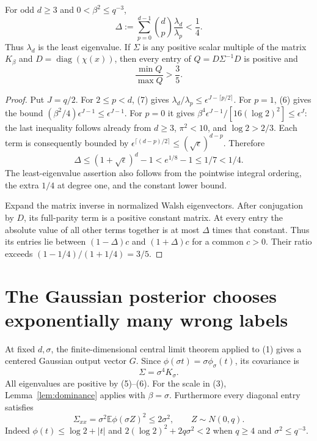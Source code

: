 \documentclass[11pt]{article}
\newcommand{\E}{\mathbb E}\newcommand{\Pp}{\mathbb P}
\begin{document}
\begin{lemma}\label{lem:dominance}
For odd $d\ge3$ and $0<\beta^2\le q^{-3}$,
\[
 \Delta:=\sum_{p=0}^{d-1}\binom dp\frac{\lambda_d}{\lambda_p}
                                   <\frac14.                 \tag{9}
\]
Thus $\lambda_d$ is the least eigenvalue. If $\Sigma$ is any positive
scalar multiple of the matrix $K_\beta$ and
$D=\operatorname{diag}(\chi(x))$, then every entry of
$Q=D\Sigma^{-1}D$ is positive and
\[
                   \frac{\min Q}{\max Q}>\frac35.             \tag{10}
\]
\end{lemma}
\begin{proof}
Put $J=q/2$. For $2\le p<d$, (7) gives
$\lambda_d/\lambda_p\le\epsilon^{J-\lceil p/2\rceil}$.
For $p=1$, (6) gives the bound
$(\beta^2/4)\epsilon^{J-1}\le\epsilon^{J-1}$.
For $p=0$ it gives
$\beta^4\epsilon^{J-1}/[16(\log2)^2]\le\epsilon^J$:
the last inequality follows already from $d\ge3$, $\pi^2<10$,
and $\log2>2/3$. Each term is consequently bounded by
$\epsilon^{\lceil(d-p)/2\rceil}\le(\sqrt\epsilon)^{d-p}$.
Therefore
\[
 \Delta\le(1+\sqrt\epsilon)^d-1
                    <e^{1/8}-1\le1/7<1/4.
\]
The least-eigenvalue assertion also follows from the pointwise integral
ordering, the extra $1/4$ at degree one, and the constant lower bound.

Expand the matrix inverse in normalized Walsh eigenvectors. After
conjugation by $D$, its full-parity term is a positive constant matrix.
At every entry the absolute value of all other terms together is at
most $\Delta$ times that constant. Thus its entries lie between
$(1-\Delta)c$ and $(1+\Delta)c$ for a common $c>0$.
Their ratio exceeds $(1-1/4)/(1+1/4)=3/5$.
\end{proof}

\section{The Gaussian posterior chooses exponentially many wrong labels}
At fixed $d,\sigma$, the finite-dimensional central limit theorem
applied to (1) gives a centered Gaussian output vector $G$.
Since $\phi(\sigma t)=\sigma\phi_\sigma(t)$, its covariance is
\[
                       \Sigma=\sigma^4 K_\sigma.              \tag{11}
\]
All eigenvalues are positive by (5)--(6). For the scale in (3),
Lemma~\ref{lem:dominance} applies with $\beta=\sigma$.
Furthermore every diagonal entry satisfies
\[
 \Sigma_{xx}=\sigma^2\E\phi(\sigma Z)^2\le2\sigma^2,
                          \qquad Z\sim N(0,q).                \tag{12}
\]
Indeed $\phi(t)\le\log2+|t|$ and
$2(\log2)^2+2q\sigma^2<2$ when $q\ge4$ and $\sigma^2\le q^{-3}$.
\end{document}
